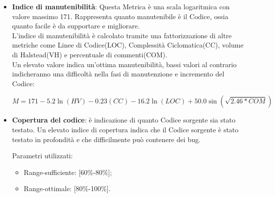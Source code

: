 {{\begin{itemize}
\begin{itemize}
	    \end{itemize}
	    Successivamente possono essere calcolati i seguenti valori:
	    \begin{itemize}
		\item \textbf{Program length:} \[N = N1 + N2\]
		\item \textbf{Program vocabulary:} \[n = n1 + n2\]
	    \item \textbf{Volume:} il volume descrive la dimensione dell’implementazione di un algoritmo e si basa sul numero di operazioni eseguite e sugli operandi di una Funzione. Il volume di una function senza parametri composta da una sola linea è 20, mentre un indice superiore a 1000 indica che probabilmente la Funzione esegue troppe operazioni. \[V= N \times \log_2(n)\]
	      \textbf{Parametri utilizzati}
	      \begin{itemize}
	       \item Range-accettazione: [20-1500];
	       \item Range-ottimale: [20-1000];
	      \end{itemize}
		\end{itemize}
		\item \textbf{Indice di manutenibilità}: Questa Metrica è una scala logaritmica con valore massimo 171. Rappresenta quanto manutenibile è il Codice, ossia quanto facile è da supportare e migliorare.\\
		L'indice di manutenibilità è calcolato tramite una fattorizzazione di altre metriche come Linee di Codice(LOC), Complessità Ciclomatica(CC), volume di Halstead(VH) e percentuale di commenti(COM).\\
		Un elevato valore indica un'ottima manutenibilità, bassi valori al contrario indicheranno una difficoltà nella fasi di manutenzione e incremento del Codice:
		
		\[M= 171 -5.2\ln(HV) -0.23(CC) -16.2\ln(LOC) +50.0\sin(\sqrt{2.46*COM})\]

		
		\item \textbf{Copertura del codice}: è indicazione di quanto Codice sorgente sia stato testato. Un elevato indice di copertura indica che il Codice sorgente è stato testato in profondità e che difficilmente può contenere dei bug.
		
		Parametri utilizzati:
		\begin{itemize}
		\item Range-sufficiente: [60\%-80\%];
		\item Range-ottimale: [80\%-100\%].
		\end{itemize}
	\end{itemize}
	}
}
